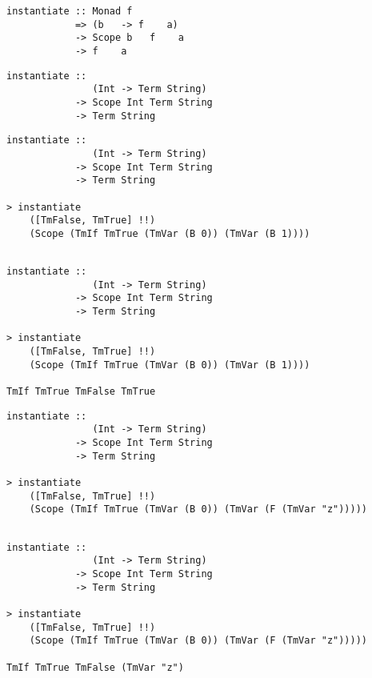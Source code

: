 \documentclass[aspectration=169]{beamer}
\begin{document}
\begin{frame}[fragile]
  \begin{overprint}
  \begin{verbatim}
instantiate :: Monad f 
            => (b   -> f    a) 
            -> Scope b   f    a 
            -> f    a
  \end{verbatim}  
  \begin{verbatim}
instantiate :: 
               (Int -> Term String) 
            -> Scope Int Term String 
            -> Term String

  \end{verbatim}  
  \begin{verbatim}
instantiate :: 
               (Int -> Term String) 
            -> Scope Int Term String 
            -> Term String

> instantiate 
    ([TmFalse, TmTrue] !!) 
    (Scope (TmIf TmTrue (TmVar (B 0)) (TmVar (B 1))))


  \end{verbatim}  
  \begin{verbatim}
instantiate :: 
               (Int -> Term String) 
            -> Scope Int Term String 
            -> Term String

> instantiate 
    ([TmFalse, TmTrue] !!) 
    (Scope (TmIf TmTrue (TmVar (B 0)) (TmVar (B 1))))

TmIf TmTrue TmFalse TmTrue
  \end{verbatim}  
  \begin{verbatim}
instantiate :: 
               (Int -> Term String) 
            -> Scope Int Term String 
            -> Term String

> instantiate 
    ([TmFalse, TmTrue] !!) 
    (Scope (TmIf TmTrue (TmVar (B 0)) (TmVar (F (TmVar "z")))))


  \end{verbatim}  
  \begin{verbatim}
instantiate :: 
               (Int -> Term String) 
            -> Scope Int Term String 
            -> Term String

> instantiate 
    ([TmFalse, TmTrue] !!) 
    (Scope (TmIf TmTrue (TmVar (B 0)) (TmVar (F (TmVar "z")))))

TmIf TmTrue TmFalse (TmVar "z")
  \end{verbatim}  
  \end{overprint}
\end{frame}
\end{document}
